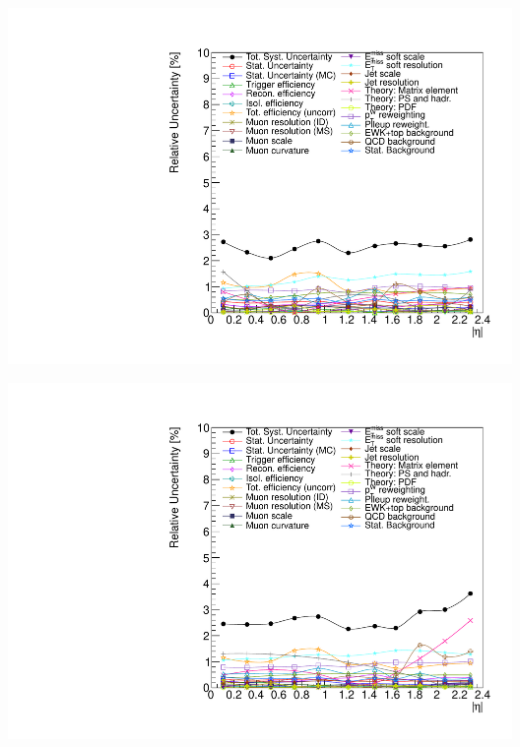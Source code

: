 {
\colb[T]
\centering
{}
\includegraphics[width=1.0\textwidth]{dates/20130602/figures/v26.allqcd/Wmn_SYSTEM_2D_PT20_NEG_Unc_2d_Slice_2}

\centering
{}
\includegraphics[width=1.0\textwidth]{dates/20130602/figures/v26.allqcd/Wmn_SYSTEM_2D_PT20_POS_Unc_2d_Slice_2}
\cole
}

